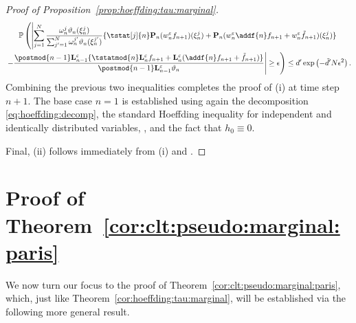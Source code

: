 \begin{proof}[Proof of Proposition~\ref{prop:hoeffding:tau:marginal}]
\begin{multline*}
\pP \left( \left|  \sum_{j = 1}^\N 
\frac{\ewght{n}{j} \adjfuncforward{n}(\epart{n}{j})}{\sum_{j' = 1}^\N \ewght{n}{j'} \adjfuncforward{n}(\epart{n}{j'})} \{ \tstat[j]{n} \prop{n} (\wgtfuncmod{n} f_{n + 1})(\epart{n}{j}) + \prop{n}(\wgtfuncmod{n} \addf{n} f_{n + 1} + \wgtfuncmod{n} \ftd{n + 1})(\epart{n}{j})\} \right. \right. \\
\left. \left. - \frac{\postmod{n - 1} \ukmod{n - 1}\{\tstatmod{n} \ukmod{n} f_{n + 1} + \ukmod{n} (\addf{n} f_{n + 1} + \ftd{n + 1})\}}{\postmod{n - 1} \ukmod{n - 1} \adjfuncforward{n}} \right| \geq \epsilon \right) \leq d' \exp \left( - \tilde{d}' N \epsilon^2 \right).  
\end{multline*}
Combining the previous two inequalities completes the proof of (i) at time step $n + 1$. The base case $n = 1$ is established using again the decomposition \eqref{eq:hoeffding:decomp}, the standard Hoeffding inequality for independent and identically distributed variables, \cite[Lemma~4]{douc:garivier:moulines:olsson:2010}, and the fact that $h_0 \equiv 0$.   

Final, (ii) follows immediately from (i) and \cite[Lemma~4]{douc:garivier:moulines:olsson:2010}.
\end{proof} 


\section{Proof of Theorem~\ref{cor:clt:pseudo:marginal:paris}}
\label{sec:proof:prop:clt:pseudo:marginal:paris}

We now turn our focus to the proof of Theorem~\ref{cor:clt:pseudo:marginal:paris}, which, just like Theorem~\ref{cor:hoeffding:tau:marginal}, will be established via the following more general result. 

